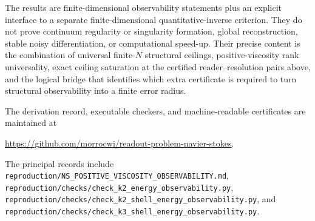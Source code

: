 \documentclass[10pt,leqno,twoside]{article}
\theoremstyle{plain}
\theoremstyle{remark}
\begin{document}
The results are finite-dimensional observability statements plus an explicit interface to a
separate finite-dimensional quantitative-inverse criterion.  They do not prove continuum
regularity or singularity formation, global reconstruction, stable noisy differentiation, or
computational speed-up.  Their precise content is the combination of universal finite-$N$
structural ceilings, positive-viscosity rank universality, exact ceiling saturation at the
certified reader--resolution pairs above, and the logical bridge that identifies which extra
certificate is required to turn structural observability into a finite error radius.

The derivation record, executable checkers, and machine-readable certificates are maintained at
\begin{center}
{\small\url{https://github.com/morrocwi/readout-problem-navier-stokes}}.
\end{center}
The principal records include\\
\texttt{reproduction/NS\_POSITIVE\_VISCOSITY\_OBSERVABILITY.md},\\
\texttt{reproduction/checks/check\_k2\_energy\_observability.py},\\
\texttt{reproduction/checks/check\_k2\_shell\_energy\_observability.py}, and\\
\texttt{reproduction/checks/check\_k3\_shell\_energy\_observability.py}.
\end{document}
